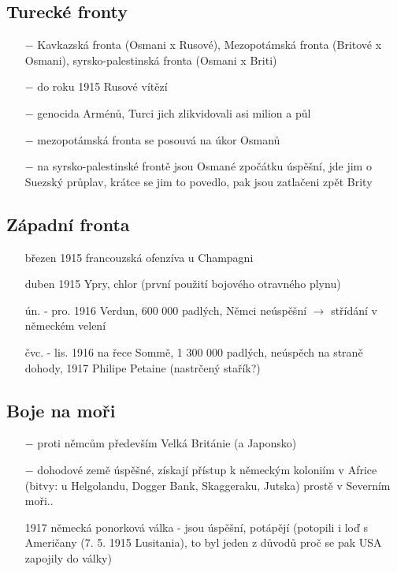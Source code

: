 \documentclass{article}
\begin{document}
\subsection*{Turecké fronty}
\begin{itemize}
    \vspace{-0.5em}
    \setlength\itemsep{0.15em}
    \item[$-$] Kavkazská fronta (Osmani x Rusové), Mezopotámská fronta (Britové x Osmani), syrsko-palestinská fronta (Osmani x Briti)
    \item[$-$] do roku 1915 Rusové vítězí
    \item[$-$] genocida Arménů, Turci jich zlikvidovali asi milion a půl
    \item[$-$] mezopotámská fronta se posouvá na úkor Osmanů
    \item[$-$] na syrsko-palestinské frontě jsou Osmané zpočátku úspěšní, jde jim o Suezský průplav, krátce se jim to povedlo, pak jsou zatlačeni zpět Brity
\end{itemize}

\subsection*{Západní fronta}
\begin{itemize}
    \vspace{-0.5em}
    \setlength\itemsep{0.15em}
    \item[březen 1915] francouzská ofenzíva u Champagni
    \item[duben 1915] Ypry, chlor (první použití bojového otravného plynu)
    \item[ún. - pro. 1916]  Verdun, 600 000 padlých, Němci neúspěšní $\rightarrow$ střídání v německém velení
    \item[čvc. - lis. 1916]  na řece Sommě, 1 300 000 padlých, neúspěch na straně dohody, 1917 Philipe Petaine (nastrčený stařík?)
\end{itemize}


\subsection*{Boje na moři}
\begin{itemize}
    \vspace{-0.5em}
    \setlength\itemsep{0.15em}
    \item[$-$] proti němcům především Velká Británie (a  Japonsko)
    \item[$-$] dohodové země úspěšné, získají přístup k německým koloniím v Africe
    (bitvy: u Helgolandu, Dogger Bank, Skaggeraku, Jutska) prostě v Severním moři..
    \item[1917]  německá ponorková válka - jsou úspěšní, potápějí (potopili i loď s Američany (7. 5. 1915 Lusitania), to byl jeden z důvodů proč se pak USA zapojily do války)
\end{itemize}
\end{document}
